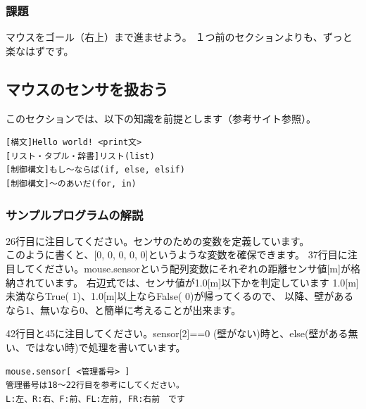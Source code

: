 \documentclass[11pt,a4paper]{jsarticle}
\begin{document}
\subsubsection{課題}
マウスをゴール（右上）まで進ませよう。
１つ前のセクションよりも、ずっと楽なはずです。


\newpage
\subsection{マウスのセンサを扱おう}
このセクションでは、以下の知識を前提とします（参考サイト参照）。
\begin{lstlisting}[frame=single]
[構文]Hello world! <print文>
[リスト・タプル・辞書]リスト(list)
[制御構文]もし～ならば(if, else, elsif)
[制御構文]～のあいだ(for, in)
\end{lstlisting}

\subsubsection{サンプルプログラムの解説}
26行目に注目してください。センサのための変数を定義しています。\\
このように書くと、[0, 0, 0, 0, 0]というような変数を確保できます。
37行目に注目してください。mouse.sensorという配列変数にそれぞれの距離センサ値[m]が格納されています。
右辺式では、センサ値が1.0[m]以下かを判定しています
1.0[m]未満ならTrue( 1)、1.0[m]以上ならFalse( 0)が帰ってくるので、
以降、壁があるなら1、無いなら0、と簡単に考えることが出来ます。

42行目と45に注目してください。sensor[2]==0 (壁がない)時と、else(壁がある無い、ではない時)で処理を書いています。


\begin{lstlisting}[frame=single]
mouse.sensor[ <管理番号> ]
管理番号は18〜22行目を参考にしてください。
L:左、R:右、F:前、FL:左前, FR:右前　です
\end{lstlisting}



\end{document}
